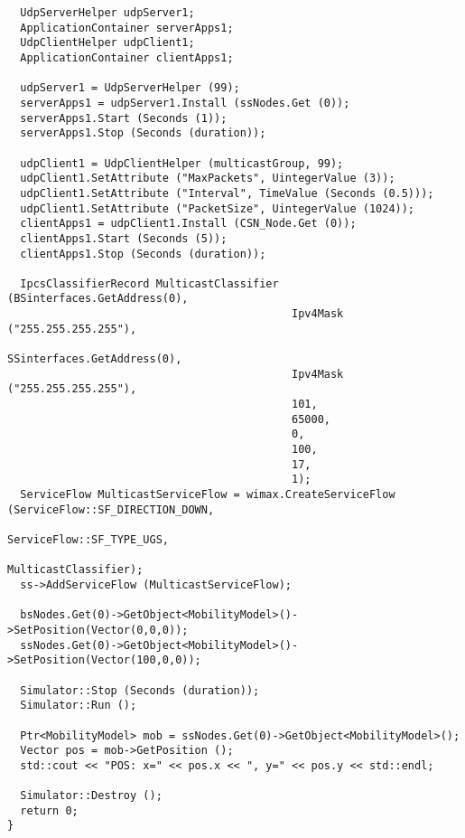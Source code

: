 \documentclass[14pt,a4paper]{article}
\begin{document}
{\begin{verbatim}
  UdpServerHelper udpServer1;
  ApplicationContainer serverApps1;
  UdpClientHelper udpClient1;
  ApplicationContainer clientApps1;

  udpServer1 = UdpServerHelper (99);
  serverApps1 = udpServer1.Install (ssNodes.Get (0));
  serverApps1.Start (Seconds (1));
  serverApps1.Stop (Seconds (duration));

  udpClient1 = UdpClientHelper (multicastGroup, 99);
  udpClient1.SetAttribute ("MaxPackets", UintegerValue (3));
  udpClient1.SetAttribute ("Interval", TimeValue (Seconds (0.5)));
  udpClient1.SetAttribute ("PacketSize", UintegerValue (1024));
  clientApps1 = udpClient1.Install (CSN_Node.Get (0));
  clientApps1.Start (Seconds (5));
  clientApps1.Stop (Seconds (duration));

  IpcsClassifierRecord MulticastClassifier (BSinterfaces.GetAddress(0),
                                            Ipv4Mask ("255.255.255.255"),
                                            SSinterfaces.GetAddress(0),
                                            Ipv4Mask ("255.255.255.255"),
                                            101,
                                            65000,
                                            0,
                                            100,
                                            17,
                                            1);
  ServiceFlow MulticastServiceFlow = wimax.CreateServiceFlow (ServiceFlow::SF_DIRECTION_DOWN,
                                                              ServiceFlow::SF_TYPE_UGS,
                                                              MulticastClassifier);
  ss->AddServiceFlow (MulticastServiceFlow);

  bsNodes.Get(0)->GetObject<MobilityModel>()->SetPosition(Vector(0,0,0));
  ssNodes.Get(0)->GetObject<MobilityModel>()->SetPosition(Vector(100,0,0));
  
  Simulator::Stop (Seconds (duration));
  Simulator::Run ();

  Ptr<MobilityModel> mob = ssNodes.Get(0)->GetObject<MobilityModel>();
  Vector pos = mob->GetPosition ();
  std::cout << "POS: x=" << pos.x << ", y=" << pos.y << std::endl;

  Simulator::Destroy ();
  return 0;
}

 \end{verbatim}}
\end{document}
